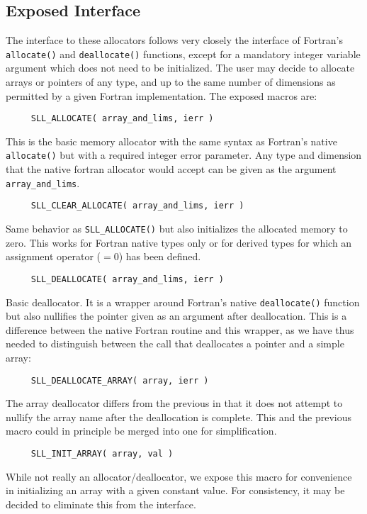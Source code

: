 \documentclass[]{report}   %
\begin{document}
\subsection{Exposed Interface}
The interface to these allocators follows very closely the interface of Fortran's \verb+allocate()+ and \verb+deallocate()+ functions, except for a mandatory integer variable argument which does not need to be initialized. The user may decide to allocate arrays or pointers of any type, and up to the same number of dimensions as permitted by a given Fortran implementation. The exposed macros are:

\begin{verbatim}
     SLL_ALLOCATE( array_and_lims, ierr )
\end{verbatim}
This is the basic memory allocator with the same syntax as Fortran's native \verb+allocate()+ but with a required integer error parameter. Any type and dimension that the native fortran allocator would accept can be given as the argument \verb+array_and_lims+.

\begin{verbatim}
     SLL_CLEAR_ALLOCATE( array_and_lims, ierr )
\end{verbatim}
Same behavior as \verb+SLL_ALLOCATE()+ but also initializes the allocated memory to zero. This works for Fortran native types only or for derived types for which an assignment operator ($= 0$) has been defined.
\begin{verbatim}
     SLL_DEALLOCATE( array_and_lims, ierr )
\end{verbatim}
Basic deallocator. It is a wrapper around Fortran's native \verb+deallocate()+ function but also nullifies the pointer given as an argument after deallocation. This is a difference between the native Fortran routine and this wrapper, as we have thus needed to distinguish between the call that deallocates a pointer and a simple array:
\begin{verbatim}
     SLL_DEALLOCATE_ARRAY( array, ierr )
\end{verbatim}
The array deallocator differs from the previous in that it does not attempt to nullify the array name after the deallocation is complete. This and the previous macro could in principle be merged into one for simplification.
\begin{verbatim}
     SLL_INIT_ARRAY( array, val )
\end{verbatim}
While not really an allocator/deallocator, we expose this macro for convenience in initializing an array with a given constant value. For consistency, it may be decided to eliminate this from the interface.
\end{document}
